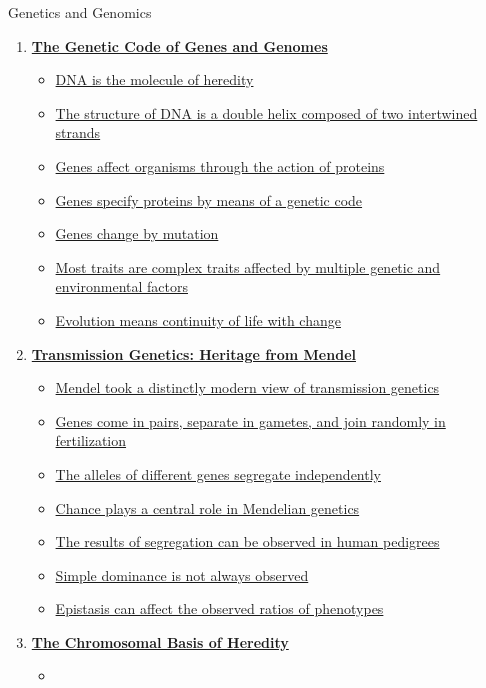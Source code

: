 \documentclass[12pt,letterpaper]{article}
\begin{document}
\begin{chapbox}{Genetics and Genomics}{ 
\begin{enumerate}[font=\bfseries, wide]
\item \hyperlink{1}{\textbf{The Genetic Code of Genes
and Genomes}}
    \begin{itemize}
        \item \hyperlink{1.1}{DNA is the molecule of heredity}
        \item \hyperlink{1.2}{The structure of DNA is a double helix composed of two intertwined strands}
        \item \hyperlink{1.3}{Genes affect organisms through the action of proteins}
        \item \hyperlink{1.4}{Genes specify proteins by means of a genetic code}
        \item \hyperlink{1.5}{Genes change by mutation}
        \item \hyperlink{1.6}{Most traits are complex traits affected by multiple genetic and environmental factors}
        \item \hyperlink{1.7}{Evolution means continuity of life with change}
    \end{itemize}
    \item \hyperlink{2}{\textbf{Transmission Genetics:
    Heritage from Mendel}}
    \begin{itemize}
        \item \hyperlink{2.1}{Mendel took a distinctly modern view of transmission genetics}
        \item \hyperlink{2.2}{Genes come in pairs, separate in gametes, and join randomly in fertilization}
        \item \hyperlink{2.3}{The alleles of different genes segregate independently}
        \item \hyperlink{2.4}{Chance plays a central role in Mendelian genetics}
        \item \hyperlink{2.5}{The results of segregation can be observed in human pedigrees}
        \item \hyperlink{2.6}{Simple dominance is not always observed}
        \item \hyperlink{2.7}{Epistasis can affect the observed ratios of phenotypes}
    \end{itemize}
    \item \hyperlink{3}{\textbf{The Chromosomal Basis
    of Heredity}}
    \begin{itemize}
        \item 

\end{itemize}
\end{enumerate}}
\end{chapbox}
\end{document}
